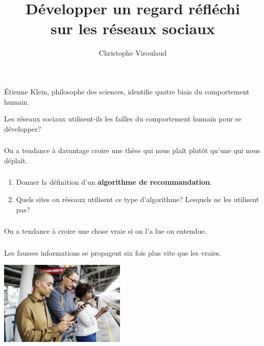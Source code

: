 \documentclass[svgnames,11pt]{beamer}
\author[]{Christophe Viroulaud}
\title{Développer un regard réfléchi\\sur les réseaux sociaux}
\date{\framebox{\textbf{ResSoc 03}}}
\institute{Seconde - SNT}
\begin{document}
\begin{frame}
\titlepage
\end{frame}
\begin{frame}

    Étienne Klein, philosophe des sciences, identifie quatre biais du comportement humain.
    \begin{framed}
        \centering Les réseaux sociaux utilisent-ils les failles du comportement humain pour se développer?
    \end{framed}
\end{frame}
\begin{frame}
    \frametitle{}

    \begin{aretenir}[Biais 1]
    \centering On a tendance à davantage croire une thèse qui nous plaît plutôt qu'une qui nous déplaît.
    \end{aretenir}
\end{frame}
\begin{frame}
    \frametitle{}

    \begin{activite}
    \begin{enumerate}
        \item Donner la définition d'un \textbf{algorithme de recommandation}.
        \item Quels sites ou réseaux utilisent ce type d'algorithme? Lesquels ne les utilisent pas?
    \end{enumerate}
    \end{activite}
\end{frame}
\begin{frame}
    \frametitle{}

    \begin{aretenir}[Biais 2]
    \centering On a tendance à croire une chose vraie si on l'a lue ou entendue.
    \end{aretenir}
\end{frame}
\begin{frame}
    \frametitle{}
\begin{aretenir}[Proposition]
    \centering Les fausses informations se propagent six fois plus vite que les vraies.
\end{aretenir}
    \begin{center}
    \centering
    \includegraphics[width=6cm]{ressources/fakenews.png}
    \label{IMG}
    \end{center}

\end{frame}
\end{document}
